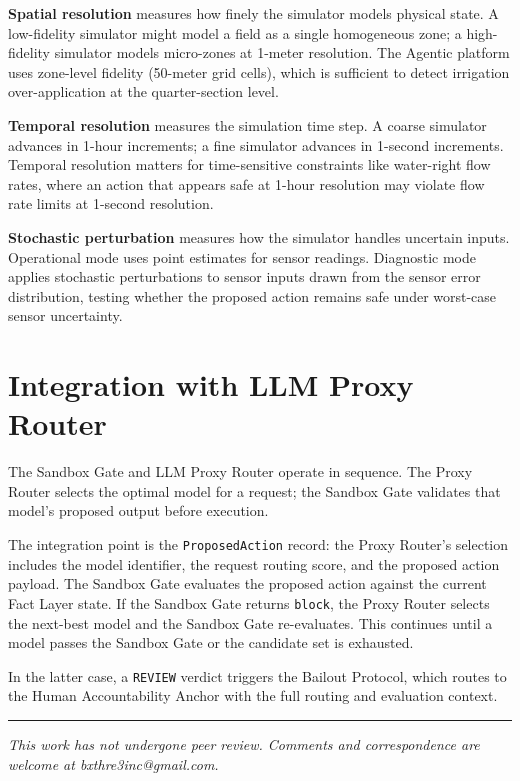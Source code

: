 \documentclass[12pt]{article}
\begin{document}
\textbf{Spatial resolution} measures how finely the simulator models physical state. A low-fidelity simulator might model a field as a single homogeneous zone; a high-fidelity simulator models micro-zones at 1-meter resolution. The Agentic platform uses zone-level fidelity (50-meter grid cells), which is sufficient to detect irrigation over-application at the quarter-section level.

\textbf{Temporal resolution} measures the simulation time step. A coarse simulator advances in 1-hour increments; a fine simulator advances in 1-second increments. Temporal resolution matters for time-sensitive constraints like water-right flow rates, where an action that appears safe at 1-hour resolution may violate flow rate limits at 1-second resolution.

\textbf{Stochastic perturbation} measures how the simulator handles uncertain inputs. Operational mode uses point estimates for sensor readings. Diagnostic mode applies stochastic perturbations to sensor inputs drawn from the sensor error distribution, testing whether the proposed action remains safe under worst-case sensor uncertainty.

\section{Integration with LLM Proxy Router}
\label{sec:sandbox-router-integration}

The Sandbox Gate and LLM Proxy Router operate in sequence. The Proxy Router selects the optimal model for a request; the Sandbox Gate validates that model's proposed output before execution.

The integration point is the \texttt{ProposedAction} record: the Proxy Router's selection includes the model identifier, the request routing score, and the proposed action payload. The Sandbox Gate evaluates the proposed action against the current Fact Layer state. If the Sandbox Gate returns \texttt{block}, the Proxy Router selects the next-best model and the Sandbox Gate re-evaluates. This continues until a model passes the Sandbox Gate or the candidate set is exhausted.

In the latter case, a \texttt{REVIEW} verdict triggers the Bailout Protocol, which routes to the Human Accountability Anchor with the full routing and evaluation context.





\vspace{2em}
\hrule
\vspace{0.5em}
\noindent\small\textit{This work has not undergone peer review. Comments and correspondence are welcome at bxthre3inc@gmail.com.}
\end{document}
